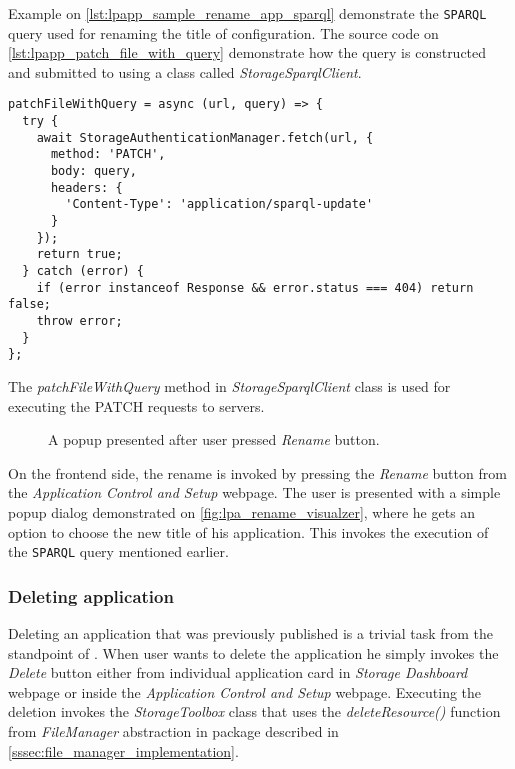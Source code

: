 Example on \autoref{lst:lpapp_sample_rename_app_sparql} demonstrate the \texttt{SPARQL} query used for renaming the title of \lpa{} configuration. The source code on \autoref{lst:lpapp_patch_file_with_query} demonstrate how the query is constructed and submitted to \solid{} using a class called \textit{StorageSparqlClient}.

\begin{listing}[H]    
\begin{verbatim}
patchFileWithQuery = async (url, query) => {
  try {
    await StorageAuthenticationManager.fetch(url, {
      method: 'PATCH',
      body: query,
      headers: {
        'Content-Type': 'application/sparql-update'
      }
    });
    return true;
  } catch (error) {
    if (error instanceof Response && error.status === 404) return false;
    throw error;
  }
};
\end{verbatim}
\caption{The \textit{patchFileWithQuery} method in \textit{StorageSparqlClient} class is used for executing the PATCH requests to \solid{} servers.} 
\label{lst:lpapp_patch_file_with_query}
\end{listing}

\begin{figure}[h]
\centering
{}
\caption{A popup presented after user pressed \textit{Rename} button.}
\label{fig:lpa_rename_visualzer}
\end{figure}

On the frontend side, the rename is invoked by pressing the \textit{Rename} button from the \textit{Application Control and Setup} webpage. The user is presented with a simple popup dialog demonstrated on \autoref{fig:lpa_rename_visualzer}, where he gets an option to choose the new title of his application. This invokes the execution of the \texttt{SPARQL} query mentioned earlier.

\subsubsection{Deleting application}

Deleting an application that was previously published is a trivial task from the standpoint of \lpas{}. When user wants to delete the application he simply invokes the \textit{Delete} button either from individual application card in \textit{Storage Dashboard} webpage or inside the \textit{Application Control and Setup} webpage. Executing the deletion invokes the \textit{StorageToolbox} class that uses the \textit{deleteResource()} function from \textit{FileManager} abstraction in \lpas{} package described in \autoref{sssec:file_manager_implementation}.

